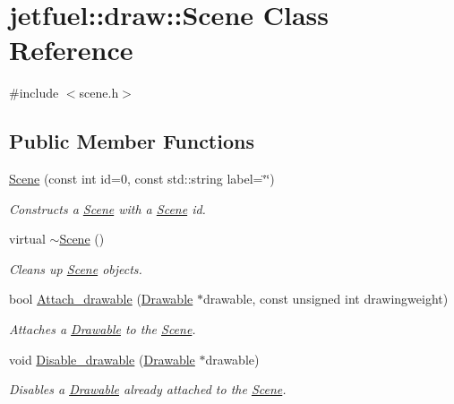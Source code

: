 \hypertarget{classjetfuel_1_1draw_1_1Scene}{}\section{jetfuel\+:\+:draw\+:\+:Scene Class Reference}
\label{classjetfuel_1_1draw_1_1Scene}


{\ttfamily \#include $<$scene.\+h$>$}

\subsection*{Public Member Functions}
\begin{DoxyCompactItemize}
\item 
\hyperlink{classjetfuel_1_1draw_1_1Scene_ad27192ba7e5f0cb23b55f5ba067cbe94}{Scene} (const int id=0, const std\+::string label=\char`\"{}\char`\"{})
\begin{DoxyCompactList}\small\item\em Constructs a \hyperlink{classjetfuel_1_1draw_1_1Scene}{Scene} with a \hyperlink{classjetfuel_1_1draw_1_1Scene}{Scene} id. \end{DoxyCompactList}\item 
virtual \hyperlink{classjetfuel_1_1draw_1_1Scene_ac3e990c0deba1b5bb8d0552033a4ad81}{$\sim$\+Scene} ()
\begin{DoxyCompactList}\small\item\em Cleans up \hyperlink{classjetfuel_1_1draw_1_1Scene}{Scene} objects. \end{DoxyCompactList}\item 
bool \hyperlink{classjetfuel_1_1draw_1_1Scene_aea4b4c4ae25c30d661be4c52787e0ea3}{Attach\+\_\+drawable} (\hyperlink{classjetfuel_1_1draw_1_1Drawable}{Drawable} $\ast$drawable, const unsigned int drawingweight)
\begin{DoxyCompactList}\small\item\em Attaches a \hyperlink{classjetfuel_1_1draw_1_1Drawable}{Drawable} to the \hyperlink{classjetfuel_1_1draw_1_1Scene}{Scene}. \end{DoxyCompactList}\item 
void \hyperlink{classjetfuel_1_1draw_1_1Scene_ab7bf5496c18d4a00e0b5ce02a203a4b4}{Disable\+\_\+drawable} (\hyperlink{classjetfuel_1_1draw_1_1Drawable}{Drawable} $\ast$drawable)
\begin{DoxyCompactList}\small\item\em Disables a \hyperlink{classjetfuel_1_1draw_1_1Drawable}{Drawable} already attached to the \hyperlink{classjetfuel_1_1draw_1_1Scene}{Scene}. \end{DoxyCompactList}\item 

\end{DoxyCompactItemize}
